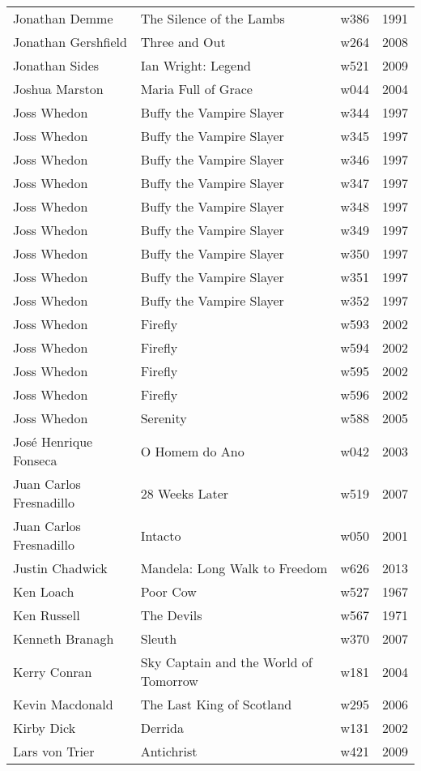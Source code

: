 \documentclass{article}
\begin{document}
\begin {center}
\begin{longtable}{l p{10cm} l l}
Jonathan Demme & The Silence of the Lambs & w386 & 1991 \\
Jonathan Gershfield & Three and Out & w264 & 2008 \\
Jonathan Sides & Ian Wright: Legend & w521 & 2009 \\
Joshua Marston & Maria Full of Grace & w044 & 2004 \\
Joss Whedon & Buffy the Vampire Slayer & w344 & 1997 \\
Joss Whedon & Buffy the Vampire Slayer & w345 & 1997 \\
Joss Whedon & Buffy the Vampire Slayer & w346 & 1997 \\
Joss Whedon & Buffy the Vampire Slayer & w347 & 1997 \\
Joss Whedon & Buffy the Vampire Slayer & w348 & 1997 \\
Joss Whedon & Buffy the Vampire Slayer & w349 & 1997 \\
Joss Whedon & Buffy the Vampire Slayer & w350 & 1997 \\
Joss Whedon & Buffy the Vampire Slayer & w351 & 1997 \\
Joss Whedon & Buffy the Vampire Slayer & w352 & 1997 \\
Joss Whedon & Firefly & w593 & 2002 \\
Joss Whedon & Firefly & w594 & 2002 \\
Joss Whedon & Firefly & w595 & 2002 \\
Joss Whedon & Firefly & w596 & 2002 \\
Joss Whedon & Serenity & w588 & 2005 \\
José Henrique Fonseca & O Homem do Ano & w042 & 2003 \\
Juan Carlos Fresnadillo & 28 Weeks Later & w519 & 2007 \\
Juan Carlos Fresnadillo & Intacto & w050 & 2001 \\
Justin Chadwick & Mandela: Long Walk to Freedom & w626 & 2013 \\
Ken Loach & Poor Cow & w527 & 1967 \\
Ken Russell & The Devils & w567 & 1971 \\
Kenneth Branagh & Sleuth & w370 & 2007 \\
Kerry Conran & Sky Captain and the World of Tomorrow & w181 & 2004 \\
Kevin Macdonald & The Last King of Scotland & w295 & 2006 \\
Kirby Dick & Derrida & w131 & 2002 \\
Lars von Trier & Antichrist & w421 & 2009 \\

\end{longtable}
\end{center}
\end{document}
